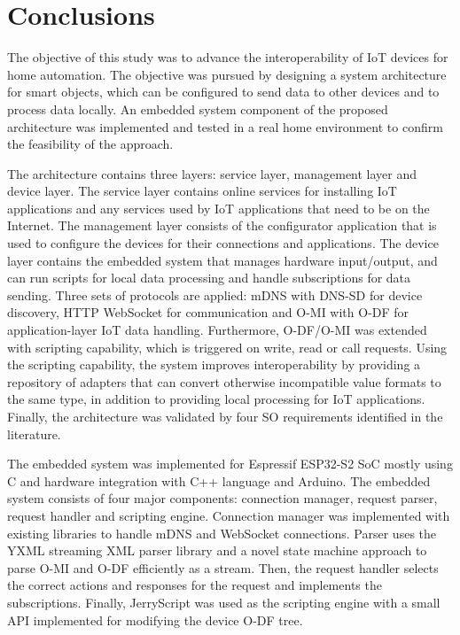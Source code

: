 \chapter{Conclusions}
\label{chapter:conclusions}


The objective of this study was to advance the interoperability of IoT devices for home automation. The objective was pursued by designing a system architecture for smart objects, which can be configured to send data to other devices and to process data locally. An embedded system component of the proposed architecture was implemented and tested in a real home environment to confirm the feasibility of the approach.

The architecture contains three layers: service layer, management layer and device layer. The service layer contains online services for installing IoT applications and any services used by IoT applications that need to be on the Internet. The management layer consists of the configurator application that is used to configure the devices for their connections and applications. The device layer contains the embedded system that manages hardware input/output, and can run scripts for local data processing and handle subscriptions for data sending. Three sets of protocols are applied: mDNS with DNS-SD for device discovery, HTTP WebSocket for communication and O-MI with O-DF for application-layer IoT data handling. Furthermore, O-DF/O-MI was extended with scripting capability, which is triggered on write, read or call requests. Using the scripting capability, the system improves interoperability by providing a repository of adapters that can convert otherwise incompatible value formats to the same type, in addition to providing local processing for IoT applications. Finally, the architecture was validated by four SO requirements identified in the literature.

The embedded system was implemented for Espressif ESP32-S2 SoC mostly using C and hardware integration with C++ language and Arduino. The embedded system consists of four major components: connection manager, request parser, request handler and scripting engine. Connection manager was implemented with existing libraries to handle mDNS and WebSocket connections. Parser uses the YXML streaming XML parser library and a novel state machine approach to parse O-MI and O-DF efficiently as a stream. Then, the request handler selects the correct actions and responses for the request and implements the subscriptions. Finally, JerryScript was used as the scripting engine with a small API implemented for modifying the device O-DF tree.

